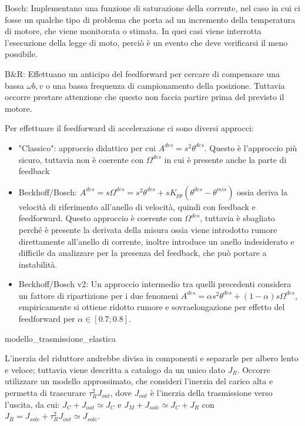 Bosch: Implementano una funzione di saturazione della corrente, nel caso in cui ci fosse un qualche tipo di problema che porta ad un incremento della temperatura di motore, che viene monitorata o stimata. In quei casi viene interrotta l'esecuzione della legge di moto, perciò è un evento che deve verificarsi il meno possibile.

B\&R: Effettuano un anticipo del feedforward per cercare di compensare una bassa \(\omega{b,v}\) o una bassa frequenza di campionamento della posizione. Tuttavia occorre prestare attenzione che questo non faccia partire prima del previsto il motore.

Per effettuare il feedforward di accelerazione ci sono diversi approcci:
\begin{itemize}
    \item "Classico": approccio didattico per cui \(A^{des}=s^2 \theta^{des}\). Questo è l'approccio più sicuro, tuttavia non è coerente con \(\Omega^{des}\) in cui è presente anche la parte di feedback
    \item Beckhoff/Bosch: \(A^{des}=s\Omega^{des}=s^2 \theta^{des}+sK_{pp}(\theta^{des}-\theta^{mis})\) ossia deriva la velocità di riferimento all'anello di velocità, quindi con feedback e feedforward. Questo approccio è coerente con \(\Omega^{des}\), tuttavia è sbagliato perché è presente la derivata della misura ossia viene introdotto rumore direttamente all'anello di corrente, inoltre introduce un anello indesiderato e difficile da analizzare per la presenza del feedback, che può portare a instabilità.
    \item Beckhoff/Bosch v2: Un approccio intermedio tra quelli precedenti considera un fattore di ripartizione per i due fenomeni \(A^{des}=\alpha s^2 \theta^{des}+(1-\alpha)s\Omega^{des}\), empiricamente si ottiene ridotto rumore e sovraelongazione per effetto del feedforward per \(\alpha \in [0.7; 0.8]\).
\end{itemize}


{modello_trasmissione_elastica}

L'inerzia del riduttore andrebbe divisa in componenti e separarle per albero lento e veloce; tuttavia viene descritta a catalogo da un unico dato \(J_R\).
Occorre utilizzare un modello approssimato, che consideri l'inerzia del carico alta e permetta di trascurare \(\tau^2_R J_{out}\), dove \(J_{out}\) è l'inerzia della trasmissione verso l'uscita, da cui: \(J_C + J_{out} \simeq J_C\) e \(J_M + J_{sole} \simeq J_C + J_R\) con \(J_R = J_{sole} + \tau^2_R J_{out} \simeq J_{sole}\).

